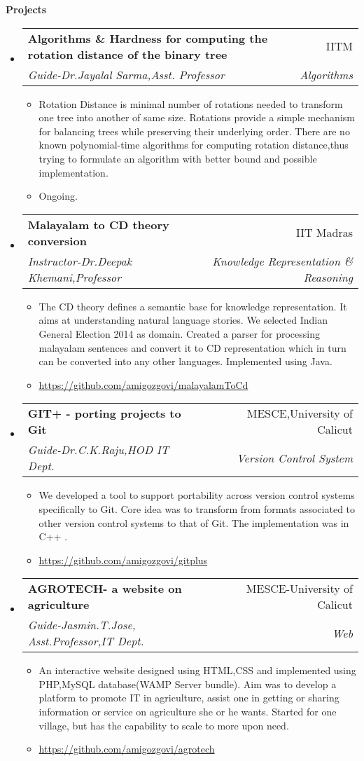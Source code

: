 \documentclass[A4paper,11pt]{article}
\makeatletter
\newcommand{\resitem}[1]{\item #1 \vspace{-2pt}}
\newcommand{\resheading}[1]{{\large \colorbox{mygrey}{\begin{minipage}{\textwidth}{\textbf{#1 \vphantom{p\^{E}}}}\end{minipage}}}}
\newcommand{\ressubheading}[4]{
\begin{tabular*}{6.5in}{l@{\extracolsep{\fill}}r}
		\textbf{#1} & #2 \\
		\textit{#3} & \textit{#4} \\
\end{tabular*}\vspace{-6pt}}
\makeatother
\begin{document}
\resheading{Projects}
\begin{itemize}

\item
	\ressubheading{Algorithms \& Hardness for computing the rotation distance of the binary tree}{IITM}{Guide-Dr.Jayalal Sarma,Asst. Professor}{Algorithms}
	\begin{itemize}
		\item{Rotation Distance is minimal number of rotations needed to transform one tree into another of same size. Rotations provide a simple mechanism for balancing trees while preserving their underlying order. There are no known polynomial-time algorithms for computing rotation distance,thus trying to formulate an algorithm with better bound and possible implementation.}
		\resitem{ Ongoing.}
	\end{itemize}
	
\item	
	\ressubheading{Malayalam to CD theory conversion}{IIT Madras}{Instructor-Dr.Deepak Khemani,Professor}{Knowledge Representation \& Reasoning}
	\begin{itemize}
		\item{The CD theory defines a semantic base for knowledge representation. It aims at understanding natural language stories. We selected Indian General Election 2014 as domain. Created a parser for processing malayalam sentences and convert it to CD representation which in turn can be converted into any other languages. Implemented using Java.}
		\resitem{\url{https://github.com/amigozgovi/malayalamToCd}}
	\end{itemize}
	
\item	
	\ressubheading{GIT+ - porting projects to Git}{MESCE,University of Calicut}{Guide-Dr.C.K.Raju,HOD IT Dept.}{Version Control System}
	\begin{itemize}
		\item{We developed a tool to support portability across version control systems specifically to Git. Core idea was to transform from formats associated to other version control systems to that of Git. The implementation was in C++ .}
		\resitem{\url{https://github.com/amigozgovi/gitplus}}
	\end{itemize}
	
\item	
	\ressubheading{AGROTECH- a website on agriculture}{MESCE-University of Calicut}{Guide-Jasmin.T.Jose, Asst.Professor,IT Dept.}{Web}
	\begin{itemize}
		\item{An interactive website designed using HTML,CSS and implemented using PHP,MySQL database(WAMP Server bundle). Aim was to develop a platform to promote IT in agriculture, assist one in getting or sharing information or service on agriculture she or he wants. Started for one village, but has the capability to scale to more upon need.}
		\resitem{\url{https://github.com/amigozgovi/agrotech}}
	\end{itemize}
\end{itemize}
\end{document}
